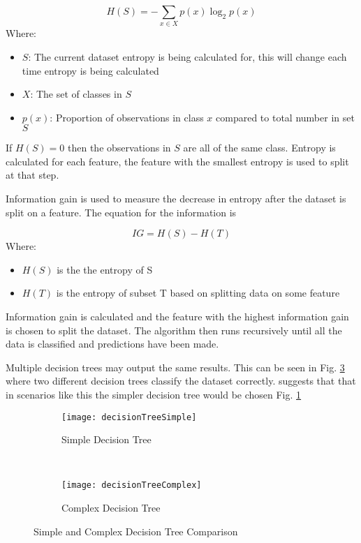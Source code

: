 \begin{equation} \label{eq:entropy}
	H(S) = - \sum_{x \in X} p(x) \log_{2} p(x)
\end{equation}
Where:
\begin{itemize}[label=]
	\item $S$: The current dataset entropy is being calculated for, this will change each time entropy is being calculated
	\item $X$: The set of classes in $S$
	\item $p(x)$: Proportion of observations in class $x$ compared to total number in set $S$
\end{itemize}
If $H(S) = 0$ then the observations in $S$ are all of the same class. Entropy is calculated for each feature, the feature with the smallest entropy is used to split at that step.

Information gain is used to measure the decrease in entropy after the dataset is split on a feature. The equation for the information is 

\begin{equation} \label{eq:infoGain}
	IG = H(S) -  H(T)
\end{equation}
Where:
\begin{itemize}[label=]
	\item $H(S)$ is the the entropy of S
	\item $H(T)$ is the entropy of subset T based on splitting data on some feature
\end{itemize}

Information gain is calculated and the feature with the highest information gain is chosen to split the dataset. The algorithm then runs recursively until all the data is classified and predictions have been made. 

Multiple decision trees may output the same results. This can be seen in Fig. \ref{fig:simpleComplex} where two different decision trees classify the dataset correctly. \cite{quinlan_induction_1986} suggests that that in scenarios like this the simpler decision tree would be chosen Fig. \ref{fig:simple}

\begin{figure}[H]
	\centering
	\begin{subfigure}[b]{0.45\textwidth}
		\captionsetup{font=scriptsize}
		\texttt{[image: decisionTreeSimple]}
		\caption{Simple Decision Tree}\label{fig:decisionTreeSimple}
		\label{fig:simple}
	\end{subfigure} ~\quad
	\begin{subfigure}[b]{0.45\textwidth}
		\captionsetup{font=scriptsize}
		\texttt{[image: decisionTreeComplex]}
		\caption{Complex Decision Tree}\label{fig:decisionTreeComplex}
		\label{fig:complex}
	\end{subfigure}
	\caption{Simple and Complex Decision Tree Comparison\\\cite[Source:][]{quinlan_induction_1986}}
	\label{fig:simpleComplex}
\end{figure}

